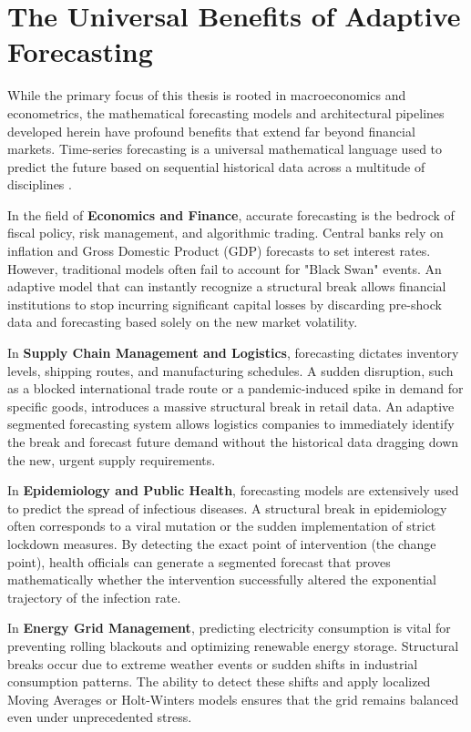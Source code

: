 \section{The Universal Benefits of Adaptive Forecasting}
While the primary focus of this thesis is rooted in macroeconomics and econometrics, the mathematical forecasting models and architectural pipelines developed herein have profound benefits that extend far beyond financial markets. Time-series forecasting is a universal mathematical language used to predict the future based on sequential historical data across a multitude of disciplines \cite{Makridakis1998}.

In the field of \textbf{Economics and Finance}, accurate forecasting is the bedrock of fiscal policy, risk management, and algorithmic trading. Central banks rely on inflation and Gross Domestic Product (GDP) forecasts to set interest rates. However, traditional models often fail to account for "Black Swan" events. An adaptive model that can instantly recognize a structural break allows financial institutions to stop incurring significant capital losses by discarding pre-shock data and forecasting based solely on the new market volatility.

In \textbf{Supply Chain Management and Logistics}, forecasting dictates inventory levels, shipping routes, and manufacturing schedules. A sudden disruption, such as a blocked international trade route or a pandemic-induced spike in demand for specific goods, introduces a massive structural break in retail data. An adaptive segmented forecasting system allows logistics companies to immediately identify the break and forecast future demand without the historical data dragging down the new, urgent supply requirements.

In \textbf{Epidemiology and Public Health}, forecasting models are extensively used to predict the spread of infectious diseases. A structural break in epidemiology often corresponds to a viral mutation or the sudden implementation of strict lockdown measures. By detecting the exact point of intervention (the change point), health officials can generate a segmented forecast that proves mathematically whether the intervention successfully altered the exponential trajectory of the infection rate.

In \textbf{Energy Grid Management}, predicting electricity consumption is vital for preventing rolling blackouts and optimizing renewable energy storage. Structural breaks occur due to extreme weather events or sudden shifts in industrial consumption patterns. The ability to detect these shifts and apply localized Moving Averages or Holt-Winters models ensures that the grid remains balanced even under unprecedented stress.

